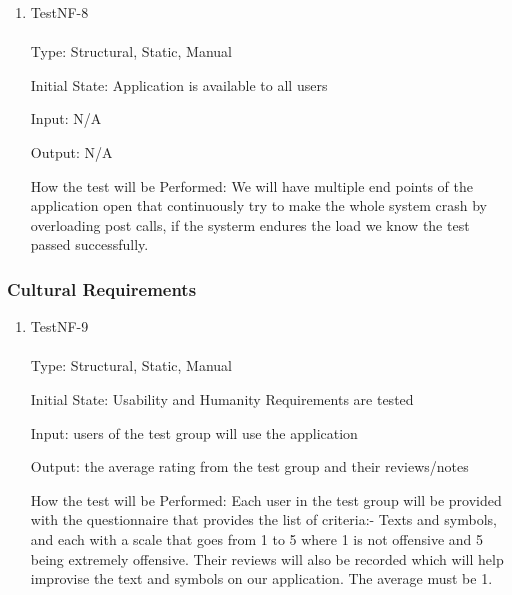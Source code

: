 \documentclass[12pt, titlepage]{article}
\begin{document}

\begin{enumerate}

\item{TestNF-8\\\\}
Type: Structural, Static, Manual

Initial State: Application is available to all users

Input: N/A

Output: N/A

How the test will be Performed: We will have multiple end points of the application open that continuously try to make the whole system crash by overloading post calls, if the systerm endures the load we know the test passed successfully.

\end{enumerate}

\subsubsection{Cultural Requirements}


\begin{enumerate}

\item{TestNF-9\\\\}
Type: Structural, Static, Manual

Initial State: Usability and Humanity Requirements are tested

Input: users of the test group will use the application 

Output: the average rating from the test group and their reviews/notes

How the test will be Performed: Each user in the test group will be provided with the questionnaire that provides the list of criteria:- Texts and symbols, and each with a scale that goes from 1 to 5 where 1 is not offensive and 5 being extremely offensive. Their reviews will also be recorded which will help improvise the text and symbols on our application. The average must be 1. 

\end{enumerate}
\end{document}
